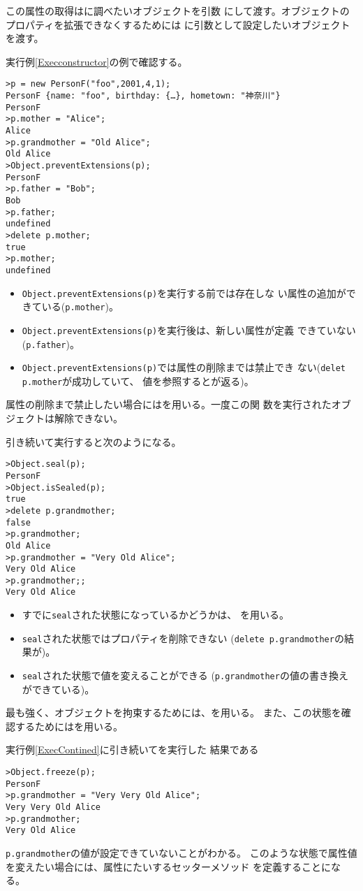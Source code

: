 この属性の取得はに調べたいオブジェクトを引数
にして渡す。オブジェクトのプロパティを拡張できなくするためには
に引数として設定したいオブジェクトを渡す。
 \begin{Exec}\upshape
  実行例\ref{Execconstructor}の例で確認する。
\begin{Verbatim}
>p = new PersonF("foo",2001,4,1);
PersonF {name: "foo", birthday: {…}, hometown: "神奈川"}
PersonF
>p.mother = "Alice";
Alice
>p.grandmother = "Old Alice";
Old Alice
>Object.preventExtensions(p);
PersonF
>p.father = "Bob";
Bob
>p.father;
undefined
>delete p.mother;
true
>p.mother;
undefined
\end{Verbatim}
\begin{itemize}
 \item \texttt{Object.preventExtensions(p)}を実行する前では存在しな
       い属性の追加ができている(\texttt{p.mother})。
 \item \texttt{Object.preventExtensions(p)}を実行後は、新しい属性が定義
			 できていない(\texttt{p.father})。
 \item \texttt{Object.preventExtensions(p)}では属性の削除までは禁止でき
       ない(\texttt{delet p.mother}が成功していて、
			 値を参照するとが返る)。
\end{itemize}
属性の削除まで禁止したい場合にはを用いる。一度この関
数を実行されたオブジェクトは解除できない。
	
引き続いて実行すると次のようになる。
\begin{Verbatim}
>Object.seal(p);
PersonF
>Object.isSealed(p);
true
>delete p.grandmother;
false
>p.grandmother;
Old Alice
>p.grandmother = "Very Old Alice";
Very Old Alice
>p.grandmother;;
Very Old Alice
\end{Verbatim}
\begin{itemize}
	 \item すでに\texttt{seal}された状態になっているかどうかは、
				 を用いる。
 \item \texttt{seal}された状態ではプロパティを削除できない
			 (\texttt{delete p.grandmother}の結果が)。
 \item \texttt{seal}された状態で値を変えることができる
			 (\texttt{p.grandmother}の値の書き換えができている)。
\end{itemize}
最も強く、オブジェクトを拘束するためには、を用いる。
また、この状態を確認するためにはを用いる。
  \begin{Exec}\upshape
   実行例\ref{ExecContined}に引き続いてを実行した
   結果である
\begin{Verbatim}
>Object.freeze(p);
PersonF
>p.grandmother = "Very Very Old Alice";
Very Very Old Alice
>p.grandmother;
Very Old Alice
\end{Verbatim}
 \texttt{p.grandmother}の値が設定できていないことがわかる。
このような状態で属性値を変えたい場合には、属性にたいするセッターメソッド
を定義することになる。
\end{Exec}
 \iffalse
 なお、\texttt{Object.seal()}や \texttt{Object.freeze()}の影響は、渡され
 たオブジェクト自身の属性にしか影響を及ぼさない。継承元のオブジェクトに
 は影響を及ぼさない。
 \fi

\end{Exec}
